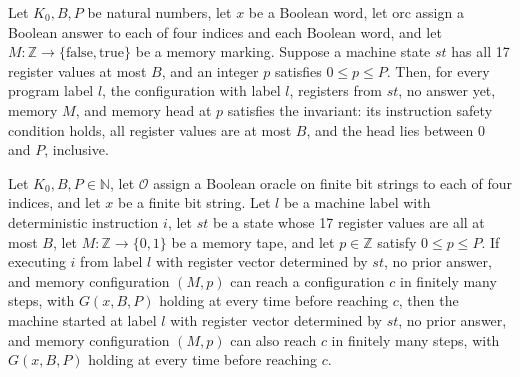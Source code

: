 \begin{lemma}
\label{Complexity.LogProg.ExpBFS.g_of}
\leanok
{}
Let $K_0,B,P$ be natural numbers, let $x$ be a Boolean word, let $\text{orc}$ assign a
Boolean answer to each of four indices and each Boolean word, and let
$M\colon\mathbb{Z}\to\{\mathrm{false},\mathrm{true}\}$ be a memory marking. Suppose a
machine state $st$ has all 17 register values at most $B$, and an integer $p$ satisfies
$0\le p\le P$. Then, for every program label $l$, the configuration with label $l$,
registers from $st$, no answer yet, memory $M$, and memory head at $p$ satisfies the
invariant: its instruction safety condition holds, all register values are at most $B$,
and the head lies between $0$ and $P$, inclusive.
\end{lemma}

\begin{lemma}
\label{Complexity.LogProg.ExpBFS.step_of}
\leanok
{}
Let $K_0,B,P\in\mathbb{N}$, let $\mathcal O$ assign a Boolean oracle on finite bit
strings to each of four indices, and let $x$ be a finite bit string. Let $l$ be a
machine label with deterministic instruction $i$, let $st$ be a state whose 17 register
values are all at most $B$, let $M\colon\mathbb{Z}\to\{0,1\}$ be a memory tape, and let
$p\in\mathbb{Z}$ satisfy $0\le p\le P$. If executing $i$ from label $l$ with register
vector determined by $st$, no prior answer, and memory configuration $(M,p)$ can reach a
configuration $c$ in finitely many steps, with $G(x,B,P)$ holding at every time before
reaching $c$, then the machine started at label $l$ with register vector determined by
$st$, no prior answer, and memory configuration $(M,p)$ can also reach $c$ in finitely
many steps, with $G(x,B,P)$ holding at every time before reaching $c$.
\end{lemma}

